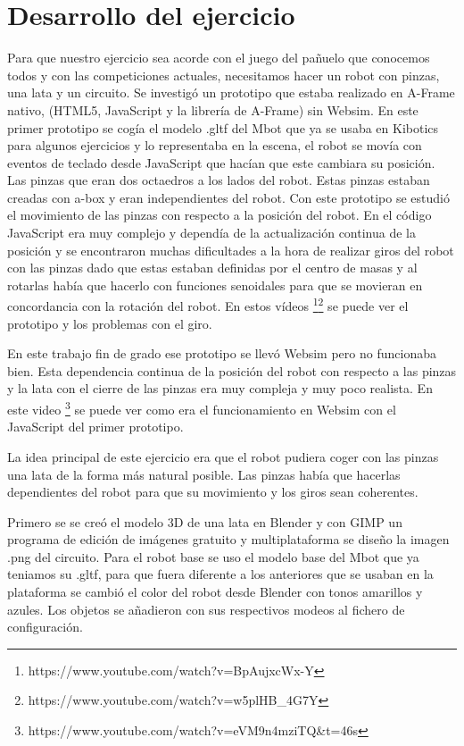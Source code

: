 \section{Desarrollo del ejercicio}

Para que nuestro ejercicio sea acorde con el juego del pañuelo que conocemos todos y con las competiciones actuales, necesitamos hacer un robot con pinzas, una lata  y un circuito.
Se investigó un prototipo que estaba realizado en A-Frame nativo, (HTML5, JavaScript y la librería de A-Frame) sin Websim.
En este primer prototipo se cogía el modelo .gltf del Mbot que ya se usaba en Kibotics para algunos ejercicios y lo representaba en la escena, el robot se movía con eventos de teclado desde JavaScript que hacían que este cambiara su posición. Las pinzas que eran dos octaedros a los lados del robot. Estas pinzas estaban creadas con a-box y eran  independientes del robot. Con este prototipo se estudió el movimiento de las pinzas con respecto a la posición del robot. En el código JavaScript era muy complejo y dependía de la actualización continua de la posición y se encontraron muchas dificultades a la hora de realizar giros del robot con las pinzas dado que estas estaban definidas por el centro de masas y al rotarlas había que hacerlo con funciones senoidales para que se movieran en concordancia con la rotación del robot. En estos vídeos \footnote{https://www.youtube.com/watch?v=BpAujxcWx-Y}\footnote{https://www.youtube.com/watch?v=w5plHB\_4G7Y} se puede ver el prototipo y los problemas con el giro.

En este trabajo fin de grado ese prototipo se llevó Websim pero no funcionaba bien. Esta dependencia continua de la posición del robot con respecto a las pinzas y la lata con el cierre de las pinzas era muy compleja y muy poco realista. En este video  \footnote{https://www.youtube.com/watch?v=eVM9n4mziTQ\&t=46s} se puede ver como era el funcionamiento en Websim con el JavaScript del primer prototipo.  


La idea principal de este ejercicio era que el robot pudiera coger con las pinzas una lata de la forma más natural posible. Las pinzas había que hacerlas dependientes del robot para que su movimiento y los giros sean coherentes. 

Primero se se creó el modelo 3D de una lata en Blender y con  GIMP un programa de edición de imágenes gratuito y multiplataforma se diseño la imagen .png del circuito. Para el robot base se uso el modelo base del Mbot que ya teniamos su  .gltf, para que fuera diferente a los anteriores que se usaban en la plataforma se cambió el color del robot desde Blender con tonos amarillos y azules.
Los objetos se añadieron con sus respectivos modeos al fichero de configuración.

